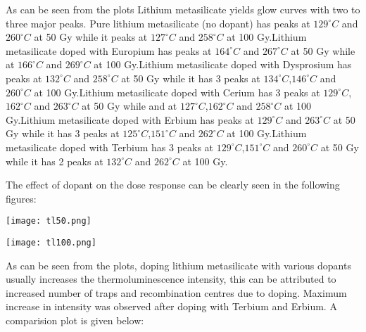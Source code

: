 \documentclass[../result.tex]{subfiles}
\begin{document}
    As can be seen from the plots Lithium metasilicate yields glow curves with two to three major peaks. Pure lithium 
    metasilicate (no dopant) has peaks at $129^{\circ}C$ and $260^{\circ}C$ at 50 Gy while it peaks at $127^{\circ}C$ 
    and $258^{\circ}C$ at 100 Gy.Lithium metasilicate doped with Europium has peaks at $164^{\circ}C$ and $267^{\circ}C$ 
    at 50 Gy while at $166^{\circ}C$ and $269^{\circ}C$ at 100 Gy.Lithium metasilicate doped with Dysprosium has peaks 
    at $132^{\circ}C$ and $258^{\circ}C$ at 50 Gy while it has 3 peaks at $134^{\circ}C$,$146^{\circ}C$ and $260^{\circ}C$ 
    at 100 Gy.Lithium metasilicate doped with Cerium has 3 peaks at $129^{\circ}C$,$162^{\circ}C$ and $263^{\circ}C$ at 
    50 Gy while and at $127^{\circ}C$,$162^{\circ}C$ and $258^{\circ}C$ at 100 Gy.Lithium metasilicate doped with Erbium 
    has peaks at $129^{\circ}C$ and $263^{\circ}C$ at 50 Gy while it has 3 peaks at $125^{\circ}C$,$151^{\circ}C$ and 
    $262^{\circ}C$ at 100 Gy.Lithium metasilicate doped with Terbium has 3 peaks at $129^{\circ}C$,$151^{\circ}C$ and 
    $260^{\circ}C$ at 50 Gy while it has 2 peaks at $132^{\circ}C$ and $262^{\circ}C$ at 100 Gy.

    The effect of dopant on the dose response can be clearly seen in the following figures:
    \FloatBarrier\begin{multicols}{2}
        \begin{Figure}
            \centering
            \texttt{[image: tl50.png]}
            \label{fig:tl50}
        \end{Figure}
        \begin{Figure}
            \centering
            \texttt{[image: tl100.png]}
            \label{fig:tl100}
        \end{Figure}
    \end{multicols}

    As can be seen from the plots, doping lithium metasilicate with various dopants usually increases the thermoluminescence 
    intensity, this can be attributed to increased number of traps and recombination centres due to doping. Maximum 
    increase in intensity was observed after doping with Terbium and Erbium. A comparision plot is given below:
\end{document}
